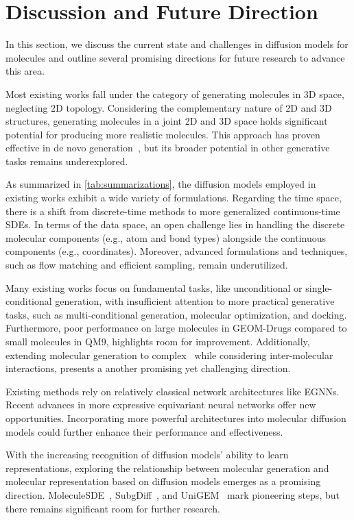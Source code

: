 \section{Discussion and Future Direction}
In this section, we discuss the current state and challenges in diffusion models for molecules and outline several promising directions for future research to advance this area.

Most existing works fall under the category of generating molecules in 3D space,
neglecting 2D topology.
Considering the complementary nature of 2D and 3D structures, generating molecules in a joint 2D and 3D space holds significant potential for producing more realistic molecules.
This approach has proven effective in de novo generation~\citep{MUDiff,JODO}, but its broader potential in other generative tasks remains underexplored.

As summarized in \cref{tab:summarizations}, 
the diffusion models employed in existing works exhibit a wide variety of formulations. Regarding the time space, there is a shift from discrete-time methods to more generalized continuous-time SDEs. In terms of the data space, an open challenge lies in handling the discrete molecular components (e.g., atom and bond types) alongside the continuous components (e.g., coordinates). Moreover, advanced formulations and techniques, such as flow matching and efficient sampling, remain underutilized.

Many existing works focus on fundamental tasks,
like unconditional or single-conditional generation, 
with insufficient attention to more practical generative tasks, such as multi-conditional generation, molecular optimization, and docking. 
Furthermore, poor performance on large molecules in GEOM-Drugs compared to small molecules in QM9, highlights room for improvement. Additionally, extending molecular generation to complex~\citep{DynamicBind} while considering inter-molecular interactions, presents a another promising yet challenging direction.

Existing methods rely on relatively classical network architectures like EGNNs. 
Recent advances in more expressive equivariant neural networks offer new opportunities. Incorporating more powerful architectures into molecular diffusion models could further enhance their performance and effectiveness.

With the increasing recognition of diffusion models' ability to learn representations, exploring the relationship between molecular generation and molecular representation based on diffusion models emerges as a promising direction. MoleculeSDE~\citep{MoleculeSDE}, SubgDiff~\citep{SubgDiff}, and UniGEM~\citep{UniGEM} mark pioneering steps, but there remains significant room for further research.
